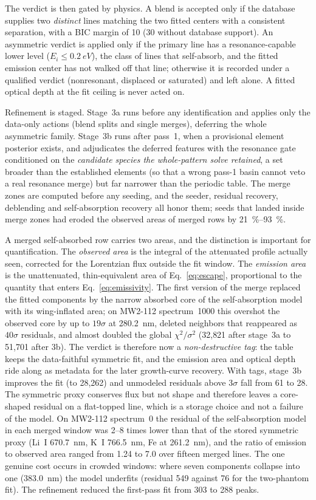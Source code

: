 The verdict is then gated by physics.
A blend is accepted only if the database supplies two \emph{distinct} lines matching the
two fitted centers with a consistent separation, with a BIC margin of 10 (30 without
database support).
An asymmetric verdict is applied only if the primary line has a resonance-capable lower
level ($E_i \le \SI{0.2}{eV}$), the class of lines that self-absorb, and the fitted
emission center has not walked off that line; otherwise it is recorded under a qualified
verdict (nonresonant, displaced or saturated) and left alone.
A fitted optical depth at the fit ceiling is never acted on.

Refinement is staged.
Stage~3a runs before any identification and applies only the data-only actions (blend
splits and single merges), deferring the whole asymmetric family.
Stage~3b runs after pass~1, when a provisional element posterior exists, and adjudicates the
deferred features with the resonance gate conditioned on the \emph{candidate species the
whole-pattern solve retained}, a set broader than the established elements (so that a
wrong pass-1 basin cannot veto a real resonance merge) but far narrower than the periodic
table.
The merge zones are computed before any seeding, and the seeder, residual recovery, deblending and self-absorption recovery all honor them; seeds that landed inside merge zones had eroded the observed areas of merged rows by \SIrange{21}{93}{\percent}.

A merged self-absorbed row carries two areas, and the distinction is important for
quantification.
The \emph{observed area} is the integral of the attenuated profile actually seen, corrected
for the Lorentzian flux outside the fit window.
The \emph{emission area} is the unattenuated, thin-equivalent area of Eq.~\eqref{eq:escape},
proportional to the quantity that enters Eq.~\eqref{eq:emissivity}.
The first version of the merge replaced the fitted components by the narrow absorbed core of the self-absorption model with its wing-inflated area; on MW2-112 spectrum~1000 this overshot the observed core by up to $19\sigma$ at \SI{280.2}{nm}, deleted neighbors that reappeared as $40\sigma$ residuals, and almost doubled the global $\chi^2/\sigma^2$ (32{,}821 after stage~3a to 51{,}701 after 3b).
The verdict is therefore now a \emph{non-destructive tag}: the table keeps the data-faithful symmetric fit, and the emission area and optical depth ride along as metadata for the later growth-curve recovery.
With tags, stage~3b improves the fit (to 28{,}262) and unmodeled residuals above $3\sigma$ fall from 61 to 28.
The symmetric proxy conserves flux but not shape and therefore leaves a core-shaped residual on a flat-topped line, which is a storage choice and not a failure of the model.
On MW2-112 spectrum~0 the residual of the self-absorption model in each merged window was
2--8 times lower than that of the stored symmetric proxy (Li~I \SI{670.7}{nm}, K~I
\SI{766.5}{nm}, Fe at \SI{261.2}{nm}), and the ratio of emission to observed area ranged from 1.24
to 7.0 over fifteen merged lines.
The one genuine cost occurs in crowded windows: where seven components collapse into one (\SI{383.0}{nm}) the model underfits (residual 549 against 76 for the two-phantom fit).
The refinement reduced the first-pass fit from 303 to 288 peaks.

